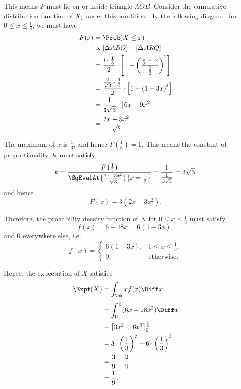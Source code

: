 \begin{enumerate}
          This means \(P\) must lie on or inside triangle \(AOB\). Consider the cumulative distribution function of \(X_1\) under this condition. By the following diagram, for \(0 \leq x \leq \frac{1}{3}\), we must have
          \begin{align*}
              F(x) & = \Prob(X \leq x)                                                                                         \\
                   & \propto [\Delta ABO] - [\Delta ARQ]                                                                       \\
                   & = \frac{l \cdot \frac{1}{3}}{2} \cdot \left[1 - \left(\frac{\frac{1}{3} - x}{\frac{1}{3}}\right)^2\right] \\
                   & = \frac{\frac{2}{\sqrt{3}} \cdot \frac{1}{3}}{2} \cdot \left[1 - \left(1 - 3x\right)^2\right]             \\
                   & = \frac{1}{3\sqrt{3}} \cdot \left[6x - 9x^2\right]                                                        \\
                   & = \frac{2x - 3x^2}{\sqrt{3}}.
          \end{align*}

          The maximum of \(x\) is \(\frac{1}{3}\), and hence \(F\left(\frac{1}{3}\right) = 1\). This means the constant of proportionality, \(k\), must satisfy
          \[
              k = \frac{F\left(\frac{1}{3}\right)}{\SqEvalAt{\frac{2x - 3x^2}{\sqrt{3}}}{x = \frac{1}{3}}} = \frac{1}{\frac{1}{3\sqrt{3}}} = 3\sqrt{3},
          \]
          and hence
          \[
              F(x) = 3(2x - 3x^2).
          \]

          Therefore, the probability density function of \(X\) for \(0 \leq x \leq \frac{1}{3}\) must satisfy
          \[
              f(x) = 6 - 18x = 6(1 - 3x),
          \]
          and \(0\) everywhere else, i.e.
          \[
              f(x) = \begin{cases}
                  6(1 - 3x), & 0 \leq x \leq \frac{1}{3}, \\
                  0,         & \text{otherwise}.
              \end{cases}
          \]

          Hence, the expectation of \(X\) satisfies
          \begin{align*}
              \Expt(X) & = \int_{\RR} x f(x) \Diff x                                               \\
                       & = \int_{0}^{\frac{1}{3}} (6x - 18x^2) \Diff x                             \\
                       & = \left[3x^2 - 6x^3\right]_{0}^{\frac{1}{3}}                              \\
                       & = 3 \cdot \left(\frac{1}{3}\right)^2 - 6 \cdot \left(\frac{1}{3}\right)^3 \\
                       & = \frac{3}{9} - \frac{2}{9}                                               \\
                       & = \frac{1}{9}.
          \end{align*}


\end{enumerate}
